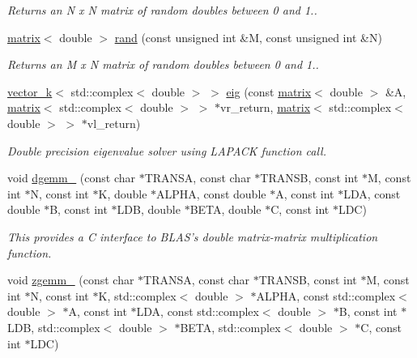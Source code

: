 \begin{DoxyCompactItemize}
\begin{DoxyCompactList}\small\item\em Returns an N x N matrix of random doubles between 0 and 1.. \end{DoxyCompactList}\item 
\hypertarget{namespacekeycpp_af6413232f2de6f8ac96efde6531c3055}{\hyperlink{classkeycpp_1_1matrix}{matrix}$<$ double $>$ \hyperlink{namespacekeycpp_af6413232f2de6f8ac96efde6531c3055}{rand} (const unsigned int \&M, const unsigned int \&N)}\label{namespacekeycpp_af6413232f2de6f8ac96efde6531c3055}

\begin{DoxyCompactList}\small\item\em Returns an M x N matrix of random doubles between 0 and 1.. \end{DoxyCompactList}\item 
\hyperlink{classkeycpp_1_1vector__k}{vector\-\_\-k}$<$ std\-::complex$<$ double $>$ $>$ \hyperlink{namespacekeycpp_aa14e19e286b30265734236c0af2f9e78}{eig} (const \hyperlink{classkeycpp_1_1matrix}{matrix}$<$ double $>$ \&A, \hyperlink{classkeycpp_1_1matrix}{matrix}$<$ std\-::complex$<$ double $>$ $>$ $\ast$vr\-\_\-return, \hyperlink{classkeycpp_1_1matrix}{matrix}$<$ std\-::complex$<$ double $>$ $>$ $\ast$vl\-\_\-return)
\begin{DoxyCompactList}\small\item\em Double precision eigenvalue solver using L\-A\-P\-A\-C\-K function call. \end{DoxyCompactList}\item 
\hypertarget{namespacekeycpp_a16b58f47ed977cafdc96227468f5f10a}{void \hyperlink{namespacekeycpp_a16b58f47ed977cafdc96227468f5f10a}{dgemm\-\_\-} (const char $\ast$T\-R\-A\-N\-S\-A, const char $\ast$T\-R\-A\-N\-S\-B, const int $\ast$M, const int $\ast$N, const int $\ast$K, double $\ast$A\-L\-P\-H\-A, const double $\ast$A, const int $\ast$L\-D\-A, const double $\ast$B, const int $\ast$L\-D\-B, double $\ast$B\-E\-T\-A, double $\ast$C, const int $\ast$L\-D\-C)}\label{namespacekeycpp_a16b58f47ed977cafdc96227468f5f10a}

\begin{DoxyCompactList}\small\item\em This provides a C interface to B\-L\-A\-S's double matrix-\/matrix multiplication function. \end{DoxyCompactList}\item 
\hypertarget{namespacekeycpp_a29fb4e46ee1b9cce0fd8bc79a2490c72}{void \hyperlink{namespacekeycpp_a29fb4e46ee1b9cce0fd8bc79a2490c72}{zgemm\-\_\-} (const char $\ast$T\-R\-A\-N\-S\-A, const char $\ast$T\-R\-A\-N\-S\-B, const int $\ast$M, const int $\ast$N, const int $\ast$K, std\-::complex$<$ double $>$ $\ast$A\-L\-P\-H\-A, const std\-::complex$<$ double $>$ $\ast$A, const int $\ast$L\-D\-A, const std\-::complex$<$ double $>$ $\ast$B, const int $\ast$L\-D\-B, std\-::complex$<$ double $>$ $\ast$B\-E\-T\-A, std\-::complex$<$ double $>$ $\ast$C, const int $\ast$L\-D\-C)}\label{namespacekeycpp_a29fb4e46ee1b9cce0fd8bc79a2490c72}


\end{DoxyCompactItemize}
